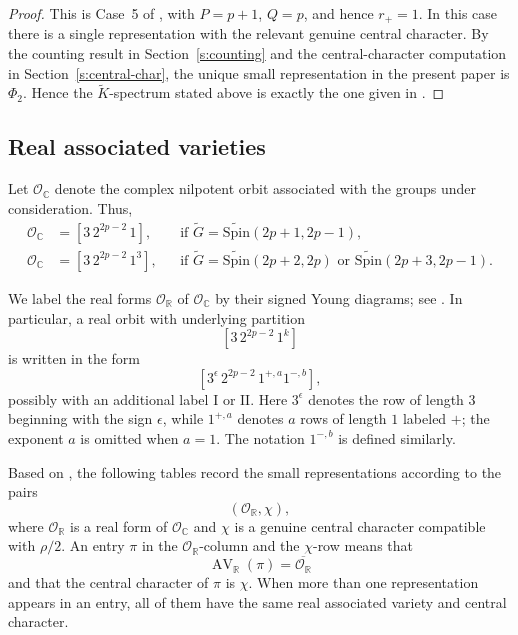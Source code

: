 \documentclass{amsart}
\newcommand{\bbC}{{\mathbb{C}}}
\newcommand{\bbR}{{\mathbb R}}
\newcommand{\Spin}{{\mathrm{Spin}}}
\theoremstyle{definition}
\newcommand{\tu}{\widetilde}
\begin{document}
\begin{proof}
This is Case~5 of \cite[Theorem~4.1]{BTs18}, with
$P=p+1$, $Q=p$, and hence $r_+=1$.
In this case there is a single representation with the relevant
genuine central character. By the counting result in Section~\ref{s:counting} and the
central-character computation in Section~\ref{s:central-char}, the unique small
representation in the present paper is $\Phi_2$.  Hence the
$\tu K$-spectrum stated above is exactly the one given in
\cite[Theorem~4.1, Case~5]{BTs18}.
\end{proof}


\subsection{Real associated varieties}

Let \(\mathcal O_{\bbC}\) denote the complex nilpotent orbit associated with
the groups under consideration. Thus,
\begin{align*}
\mathcal O_{\bbC}
&=
[3\,2^{2p-2}\,1],
&&
\text{if }
\tu G=\tu{\Spin}(2p+1,2p-1),\\
\mathcal O_{\bbC}
&=
[3\,2^{2p-2}\,1^3],
&&
\text{if }
\tu G=\tu{\Spin}(2p+2,2p)
\text{ or }
\tu{\Spin}(2p+3,2p-1).
\end{align*}

We label the real forms \(\mathcal O_{\bbR}\) of \(\mathcal O_{\bbC}\)
by their signed Young diagrams; see \cite{CM93}. In particular, a real
orbit with underlying partition
\[
[3\,2^{2p-2}\,1^k]
\]
is written in the form
\[
[3^\epsilon\,2^{2p-2}\,1^{+,a}1^{-,b}],
\]
possibly with an additional label \(\mathrm{I}\) or \(\mathrm{II}\).
Here \(3^\epsilon\) denotes the row of length \(3\) beginning with the
sign \(\epsilon\), while \(1^{+,a}\) denotes \(a\) rows of length \(1\)
labeled \(+\); the exponent \(a\) is omitted when \(a=1\). The notation
\(1^{-,b}\) is defined similarly.

Based on \cite[Section~4.3]{BTs18}, the following tables record the small
representations according to the pairs
\[
(\mathcal O_{\bbR},\chi),
\]
where \(\mathcal O_{\bbR}\) is a real form of \(\mathcal O_{\bbC}\) and
\(\chi\) is a genuine central character compatible with \(\rho/2\).
An entry \(\pi\) in the \(\mathcal O_{\bbR}\)-column and the \(\chi\)-row
means that
\[
\operatorname{AV}_{\bbR}(\pi)
=
\overline{\mathcal O_{\bbR}}
\]
and that the central character of \(\pi\) is \(\chi\). When more than one
representation appears in an entry, all of them have the same real
associated variety and central character.
\end{document}
